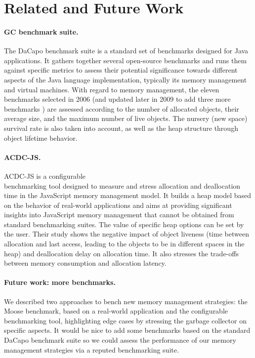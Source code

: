 \documentclass[10pt, sigplan]{acmart}
\begin{document}
\section{Related and Future Work}

\paragraph{GC benchmark suite.} The DaCapo benchmark suite \cite{DacapoBench} is a standard set of benchmarks designed for Java applications. It gathers together several open-source benchmarks and runs them against specific metrics to assess their potential significance towards different aspects of the Java language implementation, typically its memory management and virtual machines.
With regard to memory management, the eleven benchmarks selected in 2006 (and updated later in 2009 to add three more benchmarks \cite{DaCapo}) are assessed according to the number of allocated objects, their average size, and the maximum number of live objects. The nursery (new space) survival rate is also taken into account, as well as the heap structure through object lifetime behavior.

\paragraph{ACDC-JS.}
ACDC-JS \cite{ACDCJS} is a configurable \\benchmarking tool designed to measure and stress allocation and deallocation time in the JavaScript memory management model. 
It builds a heap model based on the behavior of real-world applications and aims at providing significant insights into JavaScript memory management that cannot be obtained from standard benchmarking suites. The value of specific heap options can be set by the user. 
Their study shows the negative impact of object liveness (time between allocation and last access, leading to the objects to be in different spaces in the heap) and deallocation delay on allocation time. It also stresses the trade-offs between memory consumption and allocation latency.

\paragraph{Future work: more benchmarks.}
We described two approaches to bench new memory management strategies: the Moose benchmark, based on a real-world application and the configurable benchmarking tool, highlighting edge cases by stressing the garbage collector on specific aspects. It would be nice to add some benchmarks based on the standard DaCapo benchmark suite so we could assess the performance of our memory management strategies via a reputed benchmarking suite.
\end{document}

